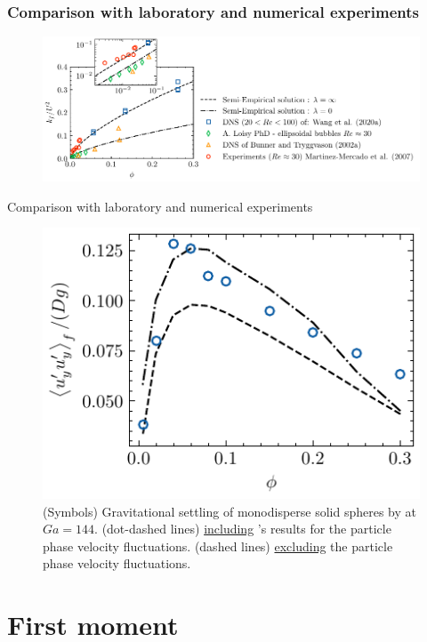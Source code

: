\documentclass{sintefbeamer}
\begin{document}
\begin{frame}
  \frametitle{Comparison with laboratory and numerical experiments }

  \begin{figure}
    \centering
    \includegraphics[height = 0.35\textwidth]{image/HOMOGENEOUS_final/CA/KFliterature_diapo.pdf}
\end{figure}

\end{frame}

\begin{frame}{Comparison with laboratory and numerical experiments }

  \begin{figure}
    \centering
    \includegraphics[height = 0.3\textwidth]{image/HOMOGENEOUS_final/CA/tariq.pdf}
    \caption{
    (Symbols) Gravitational settling of monodisperse solid spheres by \citet{shajahan2023inertial} at $Ga = 144$. 
    (dot-dashed lines) \underline{including} \citet{shajahan2023inertial}'s results for the particle phase velocity fluctuations. 
    (dashed lines) \underline{excluding} the particle phase velocity fluctuations. 
    }
    \label{fig:tariq}
\end{figure}
\end{frame}





\section{First moment}
\section*{}
\end{document}
